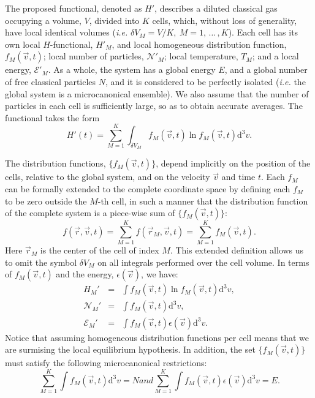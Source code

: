 The proposed functional, denoted as $H'$, describes a diluted classical
gas occupying a volume, $V$,
divided into $K$ cells, which, without loss of generality,
have local identical volumes (\textit{i.e.} $\delta V_M = V/K,\ M=1,\,\dots\,,K$).
Each cell has its own local
$H$-functional, $H'_M$, and local homogeneous distribution function,
$f_{M}(\vec{v},t)$; local number of particles, $\mathcal{N}'_M$;
local temperature, $T_M$; and a local energy, $\mathcal{E}'_M$. As a whole, the system has a
global energy $E$, and a global number of free
classical particles $N$, and it is considered to be perfectly isolated (\textit{i.e.} the
global system is a microcanonical ensemble). We also assume that the number of particles
in each cell is sufficiently large, so as to obtain accurate averages.
The functional takes the form
%
\begin{equation}\label{eq:CH2}
   H'(t)=\sum_{M=1}^{K}\int_{\delta V_M} f_M(\vec{v},t) \ln f_M(\vec{v},t)\mathrm{d}^3v.
\end{equation}
%


The distribution functions, $\{f_M(\vec{v},t)\}$, depend implicitly on the position of the cells,
relative to the global system, and on the velocity
$\vec{v}$ and time $t$. Each $f_M$ can be formally extended to the complete coordinate space
by defining each $f_M$ to be zero outside the $M$-th cell, in such a manner that
the distribution function of the complete system is a piece-wise sum
of $\{f_M(\vec v,t)\}$:
%
\begin{equation}
   f(\vec r,\vec v,t)=\sum_{M=1}^Kf(\vec r_M,\vec v,t)=\sum_{M=1}^Kf_M(\vec v,t).
\end{equation}
%
Here $\vec r_M$ is the center of the cell of index $M$. This extended definition
allows us to omit the symbol $\delta V_M$ on all integrals performed over the cell volume.
In terms of $f_M(\vec{v},t)$ and the energy, $\epsilon(\vec{v})$, we have:
%
\begin{subequations}\label{eq:cellrestrictions}
\begin{eqnarray}
    H_M' & = &  \int f_M(\vec{v},t) \ln f_{M}(\vec{v},t)
      \mathrm{d}^{3}v \label{eq:Hcell},\\
    \mathcal{N}_M' & = & \int f_{M}(\vec{v} ,t) \mathrm{d}^{3}v,\label{eq:Ncell}\\
    \mathcal{E}_M' & = & \int f_{M}(\vec{v},t)\epsilon(\vec{v}) \mathrm{d}^{3}v\label{eq:Ecell}.
\end{eqnarray}
\end{subequations}
%
Notice that assuming homogeneous distribution functions per cell means that we are surmising the 
local equilibrium hypothesis. In addition, the set $\{f_{M}(\vec{v},t)\}$ must satisfy the following
microcanonical restrictions:
%
\begin{subequations}\label{eq:micro}
\begin{equation}\label{eq:micron}
    \sum_{M=1}^{K}\int f_M(\vec{v},t)\mathrm{d}^3v =N
\end{equation}
and
\begin{equation}\label{eq:microe}
    \sum_{M=1}^{K}\int f_M(\vec{v},t)\epsilon(\vec{v})\mathrm{d}^3v=E.
\end{equation}
\end{subequations}
%

